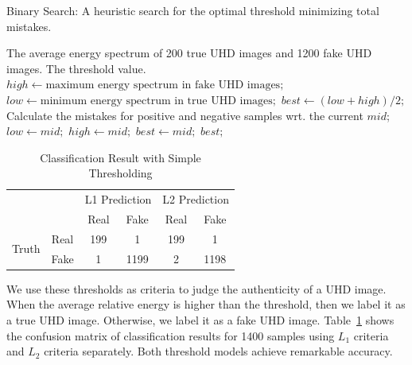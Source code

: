 \documentclass[journal,conference]{IEEEtran}
\begin{document}
\begin{algorithm}[h]
	\caption{Binary Search: A heuristic search for the optimal threshold minimizing total mistakes.}
	\label{alg:binary-search}
	\begin{algorithmic}
		\Require The average energy spectrum of 200 true UHD images and 1200 fake UHD images.
		\Ensure The threshold value.
		\State $high \leftarrow \text{maximum energy spectrum in fake UHD images};$
		\State $low \leftarrow \text{minimum energy spectrum in true UHD images};$
		\State $best \leftarrow (low + high) / 2;$
			\State Calculate the mistakes for positive and negative samples wrt. the current $mid$;
				\State $low \leftarrow mid;$
			\Else
				\State $high \leftarrow mid;$
			\EndIf
				\State $best \leftarrow mid;$
			\EndIf
		\EndWhile
		\State \Return $best;$
	\end{algorithmic}
\end{algorithm}

\linespread{1.2}
\begin{table}[h]
	\centering
	\caption{Classification Result with Simple Thresholding}
	\label{tab:threshold-confusion-table}
	\begin{tabular}{|c|c|c|c|c|c|}
	\hline
	\multicolumn{2}{|c|}{\multirow{2}{*}{}} & \multicolumn{2}{c|}{L1 Prediction} & \multicolumn{2}{c|}{L2 Prediction} \\ \cline{3-6} 
	\multicolumn{2}{|c|}{}                  & Real             & Fake            & Real             & Fake            \\ \hline
	\multirow{2}{*}{Truth}      & Real      & 199              & 1               & 199              & 1               \\ \cline{2-6} 
								& Fake      & 1                & 1199            & 2                & 1198            \\ \hline
	\end{tabular}
\end{table}
\linespread{1.0}

We use these thresholds as criteria to judge the authenticity of a UHD image.
When the average relative energy is higher than the threshold, then we label it as a true UHD image.
Otherwise, we label it as a fake UHD image.
Table~\ref{tab:threshold-confusion-table} shows the confusion matrix of classification results for 1400 samples using $L_1$ criteria and $L_2$ criteria separately.
Both threshold models achieve remarkable accuracy.
\end{document}
